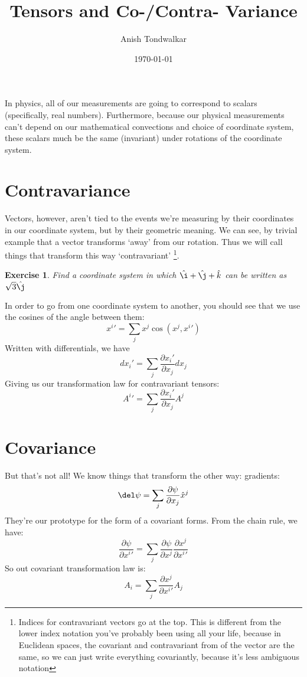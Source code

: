 \documentclass[11pt,notitlepage]{article}
\title{Tensors and Co-/Contra- Variance}
\author{Anish Tondwalkar}
\date{\today}
\newtheorem{exc}{Exercise}[section]
\begin{document}
\maketitle
In physics, all of our measurements are going to correspond to scalars (specifically, real numbers). 
Furthermore, because our physical measurements can't depend on our mathematical convections and choice of coordinate system,
these scalars much be the same (invariant) under rotations of the coordinate system.
\section{Contravariance}
Vectors, however, aren't tied to the events we're measuring by their coordinates in our coordinate system, but by their geometric meaning.
We can see, by trivial example that a vector transforms `away' from our rotation. 
Thus we will call things that transform this way `contravariant'
\footnote{Indices for contravariant vectors go at the top. This is different from the lower index notation you've probably been using all your life, because in Euclidean spaces, the covariant and contravariant from of the vector are the same, so we can just write everything covariantly, because it's less ambiguous notation}. 
\begin{exc}
Find a coordinate system in which
$\hat\i + \hat\j + \hat k$
 can be written as $\sqrt3 \hat\j$
\end{exc}
In order to go from one coordinate system to another, you should see that we use the cosines of the angle between them:
$$ x^i' = \sum_j x^j \cos(x^j,x^i') $$
Written with differentials, we have
$$ dx_i' = \sum_j \frac{\partial x_i'}{\partial x_j} dx_j $$
Giving us our transformation law for contravariant tensors:
$$ A^i' = \sum_j \frac{\partial x_i'}{\partial x_j} A^j $$
\section{Covariance}
But that's not all! We know things that transform the other way: gradients:
$$ \del \psi = \sum_j \frac{\partial \psi}{\partial x_j} \hat x^j $$
 They're our prototype for the form of a covariant forms. 
From the chain rule, we have: 
$$\frac{\partial \psi}{\partial x^i'} = \sum_j \frac{\partial \psi}{\partial x^j} \frac{\partial x^j}{\partial x^i'} $$
So out covariant transformation law is:
$$ A_i = \sum_j \frac{\partial x^j}{\partial x^i'} A_j$$


  
\end{document}
